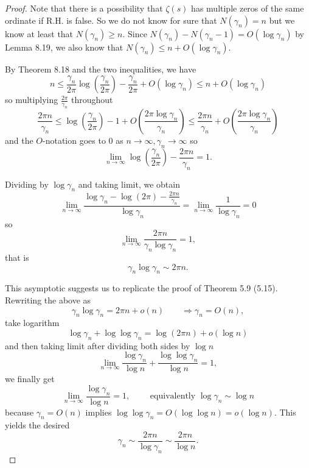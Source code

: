 \documentclass[12pt]{article}
\renewcommand{\O}[1]{O\left( #1 \right)}
\begin{document}
\begin{proof}
Note that there is a possibility that $\zeta(s)$ has multiple zeros of the same ordinate if R.H. is false. So we do not know for sure that $N(\gamma_n) = n$ but we know at least that $N(\gamma_n) \geq n$. Since $N(\gamma_n) - N(\gamma_n - 1) = O(\log \gamma_n)$ by Lemma 8.19, we also know that $N(\gamma_n) \leq n + O(\log \gamma_n)$.

By Theorem 8.18 and the two inequalities, we have
$$n \leq \frac{\gamma_n}{2\pi} \log\left( \frac{\gamma_n}{2\pi} \right) - \frac{\gamma_n}{2\pi} + O(\log \gamma_n) \leq n + O(\log \gamma_n)$$
so multiplying $\frac{2\pi}{\gamma_n}$ throughout
$$\frac{2 \pi n}{\gamma_n} \leq \log\left( \frac{\gamma_n}{2\pi} \right) - 1 + \O{\frac{2\pi \log \gamma_n}{\gamma_n}} \leq \frac{2\pi n}{\gamma_n} + \O{\frac{2\pi \log \gamma_n}{\gamma_n}}$$
and the $O$-notation goes to 0 as $n \rightarrow \infty, \gamma_n \rightarrow \infty$ so
$$\lim_{n \rightarrow \infty} \log\left( \frac{\gamma_n}{2\pi} \right) - \frac{2 \pi n}{\gamma_n} = 1.$$

Dividing by $\log \gamma_n$ and taking limit, we obtain
$$\lim_{n \rightarrow \infty} \frac{\log \gamma_n - \log(2\pi) - \frac{2 \pi n}{\gamma_n}}{\log \gamma_n} = \lim_{n \rightarrow \infty} \frac{1}{\log\gamma_n} = 0$$
so
$$\lim_{n \rightarrow \infty} \frac{2 \pi n}{\gamma_n \log \gamma_n} = 1,$$
that is
$$\gamma_n \log \gamma_n \sim 2 \pi n.$$

This asymptotic suggests us to replicate the proof of Theorem 5.9 (5.15). Rewriting the above as
$$\gamma_n \log \gamma_n = 2 \pi n + o(n) \qquad \Longrightarrow \gamma_n = O(n),$$
take logarithm
$$\log \gamma_n + \log \log \gamma_n = \log(2\pi n) + o(\log n)$$
and then taking limit after dividing both sides by $\log n$
$$\lim_{n \rightarrow \infty} \frac{\log \gamma_n}{\log n} + \frac{\log \log \gamma_n}{\log n} = 1,$$
we finally get
$$\lim_{n \rightarrow \infty} \frac{\log \gamma_n}{\log n} = 1, \qquad\text{ equivalently } \log \gamma_n \sim \log n$$
because $\gamma_n = O(n)$ implies $\log \log \gamma_n = O(\log \log n) = o(\log n)$. This yields the desired
$$\gamma_n \sim \frac{2\pi n}{\log \gamma_n} \sim \frac{2 \pi n}{\log n}.$$

\end{proof}

\unless\ifdefined\IsMainDocument
\end{document}
